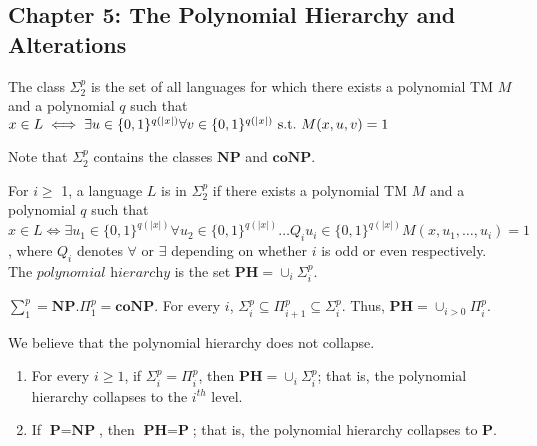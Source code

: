 \subsection*{Chapter 5: The Polynomial Hierarchy and Alterations}
\begin{note}
The class $\Sigma_{2}^{p}$ is the set of all languages for which
there exists a polynomial TM $M$
and a polynomial $q$ such that
$x \in L \iff \exists u \in \{0,1\}^{q(|x|)} \forall v \in
\{0,1\}^{q(|x|)} \mathrm{\ s.t.\ } M(x, u, v) = 1 $

Note that $\Sigma_{2}^{p}$ contains the
classes $\textbf{NP}$ and $\textbf{coNP}$.
\end{note}

\begin{note}
For $ i \geq$ 1, a language $L$ is in $\Sigma_{2}^{p}$ if
there exists a polynomial TM $M$ and a polynomial $q$ such that
$x \in L \iff \exists u_{1} \in \{0,1\}^{q(|x|)}
  \forall u_{2} \in \{0,1\}^{q(|x|)} \ldots
Q_{i}u_{i} \in \{0,1\}^{q(|x|)} M(x, u_{1}, \ldots, u_{i}) = 1 $,
where $Q_i$ denotes $\forall$ or $\exists$ depending on
whether $i$ is odd or even respectively.
The $\textit{polynomial hierarchy}$ is the set $\textbf{PH} = \cup_{i} \Sigma_{i}^{p}$.
\end{note}

\begin{note}
$\sum_{1}^{p} = \textbf{NP}. 
\Pi_{1}^{p} = \textbf{coNP}$. 
For every $i$, $\Sigma_{i}^{p} \subseteq \Pi_{i+1}^{p} \subseteq \Sigma_{i}^{p}.$ 
Thus, $\textbf{PH} = \cup_{i > 0} \Pi_{i}^{p}$.
\end{note}

\begin{note}[Collapse]
We believe that the polynomial hierarchy does not collapse.

\begin{enumerate}
	\item
		For every $i \geq 1$, if $\Sigma_{i}^{p} = \Pi_{i}^{p}$, then 
		$\textbf{PH} = \cup_{i} \Sigma_{i}^{p}$; that is, the polynomial hierarchy collapses
		to the $i^{th}$ level.
	\item
		If $\textbf{P} = \textbf{NP}$, then $\textbf{PH} = \textbf{P}$; that is, the polynomial
		hierarchy collapses to $\textbf{P}$.
\end{enumerate}
\end{note}

